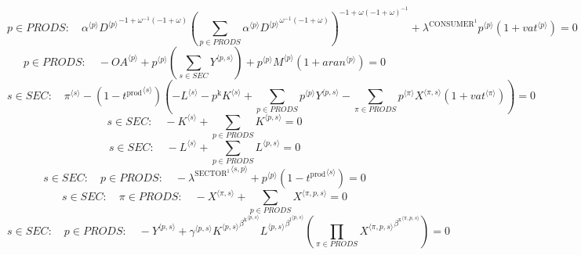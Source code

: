 \begin{equation}
p\in {P\!R\!O\!D\!S}\colon\quad {{\alpha}^{\langle p\rangle}} {{{D}^{\langle p\rangle}}^{-1 + {\omega}^{-1} \left(-1 + \omega\right)}} {\left(\sum_{p\in {P\!R\!O\!D\!S}} {{\alpha}^{\langle p\rangle}} {{{D}^{\langle p\rangle}}^{{\omega}^{-1} \left(-1 + \omega\right)}}\right)^{-1 + {\omega} \left(-1 + \omega\right)^{-1}}} + {\lambda^{\mathrm{CONSUMER}^{\mathrm{1}}}} {{p}^{\langle p\rangle}} \left(1 + {{v\!a\!t}}^{\langle p\rangle}\right) = 0
\end{equation}
\begin{equation}
p\in {P\!R\!O\!D\!S}\colon\quad -{{O\!A}}^{\langle p\rangle} + {{p}^{\langle p\rangle}} \left(\sum_{s\in {S\!E\!C}} {Y}^{\langle p,s\rangle}\right) + {{p}^{\langle p\rangle}} {{M}^{\langle p\rangle}} \left(1 + {{a\!r\!a\!n}}^{\langle p\rangle}\right) = 0
\end{equation}
\begin{equation}
s\in {S\!E\!C}\colon\quad {\pi}^{\langle s\rangle} - \left(1 - {t^{\mathrm{prod}}}^{\langle s\rangle}\right) \left(-{L}^{\langle s\rangle} - {p^{\mathrm{k}}} {{K}^{\langle s\rangle}} + \sum_{p\in {P\!R\!O\!D\!S}} {{p}^{\langle p\rangle}} {{Y}^{\langle p,s\rangle}} - \sum_{\pi\in {P\!R\!O\!D\!S}} {{p}^{\langle \pi\rangle}} {{X}^{\langle \pi,s\rangle}} \left(1 + {{v\!a\!t}}^{\langle \pi\rangle}\right)\right) = 0
\end{equation}
\begin{equation}
s\in {S\!E\!C}\colon\quad -{K}^{\langle s\rangle} + \sum_{p\in {P\!R\!O\!D\!S}} {K}^{\langle p,s\rangle} = 0
\end{equation}
\begin{equation}
s\in {S\!E\!C}\colon\quad -{L}^{\langle s\rangle} + \sum_{p\in {P\!R\!O\!D\!S}} {L}^{\langle p,s\rangle} = 0
\end{equation}
\begin{equation}
s\in {S\!E\!C}\colon\quad p\in {P\!R\!O\!D\!S}\colon\quad -{\lambda^{\mathrm{SECTOR}^{\mathrm{1}}}}^{\langle s,p\rangle} + {{p}^{\langle p\rangle}} \left(1 - {t^{\mathrm{prod}}}^{\langle s\rangle}\right) = 0
\end{equation}
\begin{equation}
s\in {S\!E\!C}\colon\quad \pi\in {P\!R\!O\!D\!S}\colon\quad -{X}^{\langle \pi,s\rangle} + \sum_{p\in {P\!R\!O\!D\!S}} {X}^{\langle \pi,p,s\rangle} = 0
\end{equation}
\begin{equation}
s\in {S\!E\!C}\colon\quad p\in {P\!R\!O\!D\!S}\colon\quad -{Y}^{\langle p,s\rangle} + {{\gamma}^{\langle p,s\rangle}} {{{K}^{\langle p,s\rangle}}^{{\beta^{\mathrm{k}}}^{\langle p,s\rangle}}} {{{L}^{\langle p,s\rangle}}^{{\beta^{\mathrm{l}}}^{\langle p,s\rangle}}} \left(\prod_{\pi\in {P\!R\!O\!D\!S}} {{X}^{\langle \pi,p,s\rangle}}^{{\beta^{\mathrm{x}}}^{\langle \pi,p,s\rangle}}\right) = 0
\end{equation}

